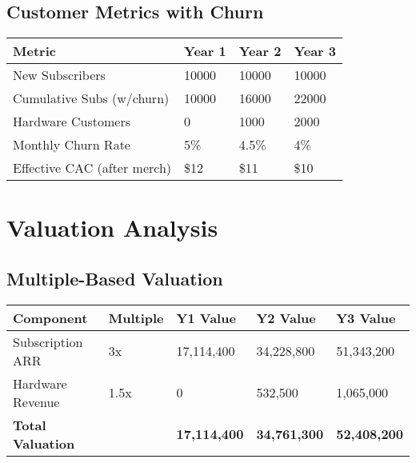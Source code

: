 \documentclass[11pt]{article}
\newcommand{\newSubsYearOne}{10000}
\newcommand{\newSubsYearTwo}{10000}
\newcommand{\newSubsYearThree}{10000}
\newcommand{\totalSubsYearOne}{10000}
\newcommand{\totalSubsYearTwo}{16000}
\newcommand{\totalSubsYearThree}{22000}
\newcommand{\hwCustomersYearTwo}{1000}
\newcommand{\hwCustomersYearThree}{2000}
\newcommand{\churnYearOne}{5}
\newcommand{\churnYearTwo}{4.5}
\newcommand{\churnYearThree}{4}
\newcommand{\arrMultiple}{3}
\newcommand{\hwMultiple}{1.5}
\begin{document}
\subsection{Customer Metrics with Churn}
\begin{table}[H]
\centering
\begin{tabularx}{\linewidth}{l Y Y Y}
\toprule
Metric & Year 1 & Year 2 & Year 3 \\\midrule
New Subscribers & \newSubsYearOne & \newSubsYearTwo & \newSubsYearThree \\
Cumulative Subs (w/churn) & \totalSubsYearOne & \totalSubsYearTwo & \totalSubsYearThree \\
Hardware Customers & 0 & \hwCustomersYearTwo & \hwCustomersYearThree \\
Monthly Churn Rate\cite{recurly2024} & \churnYearOne\% & \churnYearTwo\% & \churnYearThree\% \\
Effective CAC (after merch) & \$12 & \$11 & \$10 \\
\bottomrule
\end{tabularx}
\end{table}

\section{Valuation Analysis}

\subsection{Multiple-Based Valuation}
\begin{table}[H]
\centering
\begin{tabularx}{\linewidth}{l Y Y Y Y}
\toprule
Component & Multiple\cite{highalpha2024,openview2023} & Y1 Value & Y2 Value & Y3 Value \\\midrule
Subscription ARR & \arrMultiple x & 17,114,400 & 34,228,800 & 51,343,200 \\
Hardware Revenue & \hwMultiple x & 0 & 532,500 & 1,065,000 \\\midrule
\textbf{Total Valuation} &  & \textbf{17,114,400} & \textbf{34,761,300} & \textbf{52,408,200} \\
\bottomrule
\end{tabularx}
\end{table}


\end{document}
